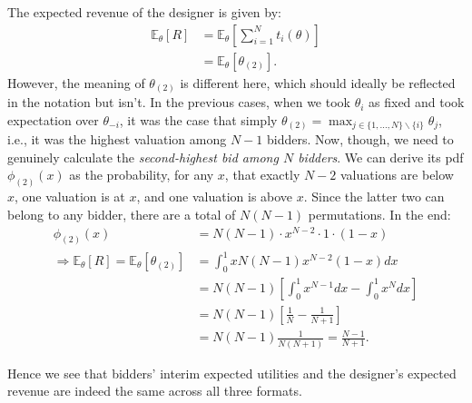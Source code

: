 \documentclass[a4paper]{article}
\begin{document}
The expected revenue of the designer is given by:
\begin{align*}
	\mathbb{E}_\theta [R]
	&= \mathbb{E}_\theta \left[ \sum_{i=1}^N t_i(\theta) \right]
	\\
	&= \mathbb{E}_\theta \left[ \theta_{(2)} \right].
\end{align*}
However, the meaning of $\theta_{(2)}$ is different here, which should ideally be reflected in the notation but isn't. In the previous cases, when we took $\theta_i$ as fixed and took expectation over $\theta_{-i}$, it was the case that simply $\theta_{(2)} = \max_{j \in \{1,...,N\} \backslash \{i\}} \theta_j$, i.e., it was the highest valuation among $N-1$ bidders. Now, though, we need to genuinely calculate the \emph{second-highest bid among $N$ bidders}. We can derive its pdf $\phi_{(2)}(x)$ as the probability, for any $x$, that exactly $N-2$ valuations are below $x$, one valuation is at $x$, and one valuation is above $x$. Since the latter two can belong to any bidder, there are a total of $N(N-1)$ permutations. In the end:
\begin{align*}
	\phi_{(2)}(x) &= N (N-1) \cdot x^{N-2} \cdot 1 \cdot (1-x)
	\\ \Rightarrow 
	\mathbb{E}_\theta [R] = \mathbb{E}_\theta \left[ \theta_{(2)} \right]
	&= \int_0^1 x N(N-1) x^{N-2} (1-x) dx
	\\
	&= N(N-1) \left[ \int_0^1 x^{N-1} dx - \int_0^1 x^N dx \right]
	\\
	&= N(N-1) \left[\frac{1}{N} - \frac{1}{N+1}\right]
	\\
	&= N(N-1) \frac{1}{N(N+1)} = \frac{N-1}{N+1}.
\end{align*}

Hence we see that bidders' interim expected utilities and the designer's expected revenue are indeed the same across all three formats.
\fi 



\end{document}
